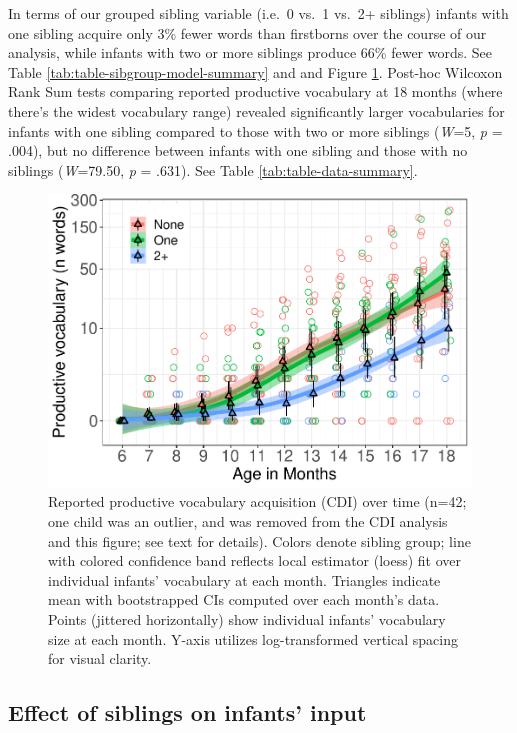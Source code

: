 \documentclass[
  english,
  man,floatsintext]{apa6}
\begin{document}
In terms of our grouped sibling variable (i.e.~0 vs.~1 vs.~2+ siblings) infants with one sibling acquire only 3\% fewer words than firstborns over the course of our analysis, while infants with two or more siblings produce 66\% fewer words. See Table \ref{tab:table-sibgroup-model-summary} and and Figure \ref{fig:Figure-SibGroup}. Post-hoc Wilcoxon Rank Sum tests comparing reported productive vocabulary at 18 months (where there's the widest vocabulary range) revealed significantly larger vocabularies for infants with one sibling compared to those with two or more siblings (\emph{W}=5, \emph{p} = .004), but no difference between infants with one sibling and those with no siblings (\emph{W}=79.50, \emph{p} = .631). See Table \ref{tab:table-data-summary}.

\begin{figure}
\centering
\includegraphics{SiblingsStudyText_files/figure-latex/Figure-SibGroup-1.pdf}
\caption{\label{fig:Figure-SibGroup}Reported productive vocabulary acquisition (CDI) over time (n=42; one child was an outlier, and was removed from the CDI analysis and this figure; see text for details). Colors denote sibling group; line with colored confidence band reflects local estimator (loess) fit over individual infants' vocabulary at each month. Triangles indicate mean with bootstrapped CIs computed over each month's data. Points (jittered horizontally) show individual infants' vocabulary size at each month. Y-axis utilizes log-transformed vertical spacing for visual clarity.}
\end{figure}

\hypertarget{effect-of-siblings-on-infants-input}{%
\subsection{Effect of siblings on infants' input}\label{effect-of-siblings-on-infants-input}}
\end{document}
